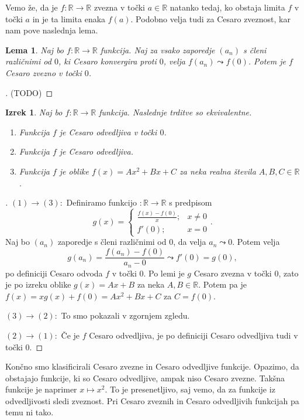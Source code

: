 \documentclass[a4paper,12pt]{article}
\theoremstyle{definition}
\theoremstyle{plain}
\newtheorem{izrek}{Izrek}
\newtheorem{lema}{Lema}
\newenvironment{dokaz}{\begin{proof}[\bfseries\upshape\proofname]}{\end{proof}}
\begin{document}
Vemo že, da je $f: \mathbb{R} \rightarrow \mathbb{R}$ zvezna v točki $a \in \mathbb{R}$ natanko tedaj, ko obstaja limita $f$ v točki $a$ in je ta limita enaka $f(a)$. Podobno velja tudi za Cesaro zveznost, kar nam pove naslednja lema.
\begin{lema}
    Naj bo $f: \mathbb{R} \rightarrow \mathbb{R}$ funkcija. Naj za vsako zaporedje $(a_n)$ s členi različnimi od $0$, ki Cesaro konvergira proti $0$, velja $f(a_n) \leadsto f(0)$. Potem je $f$ Cesaro zvezno v točki $0$.
\end{lema}
\begin{dokaz}
    (TODO)
\end{dokaz}

\begin{izrek}
    Naj bo $f: \mathbb{R} \rightarrow \mathbb{R}$ funkcija. Naslednje trditve so ekvivalentne.
    \begin{enumerate}
        \item Funkcija $f$ je Cesaro odvedljiva v točki $0$.
        \item Funkcija $f$ je Cesaro odvedljiva.
        \item Funkcija $f$ je oblike $f(x) = Ax^2 + Bx + C$ za neka realna števila $A, B, C \in \mathbb{R}$.
    \end{enumerate}
\end{izrek}
\begin{dokaz}
    $(1) \rightarrow (3): $ Definiramo funkcijo $: \mathbb{R} \rightarrow \mathbb{R}$ s predpisom 
    $$
    g(x) = \begin{cases}
        \frac{f(x)-f(0)}{x}; & x \neq 0\\
        f'(0); & x = 0
    \end{cases}.
    $$
    Naj bo $(a_n)$ zaporedje s členi različnimi od $0$, da velja $a_n \leadsto 0$. Potem velja 
    $$g(a_n) = \frac{f(a_n)-f(0)}{a_n-0} \leadsto f'(0) = g(0),$$
    po definiciji Cesaro odvoda $f$ v točki $0$. Po lemi je $g$ Cesaro zvezna v točki $0$, zato je po izreku oblike $g(x) = Ax + B$ za neka $A, B \in \mathbb{R}$. Potem pa je 
    $f(x) = xg(x) + f(0) = Ax^2 + Bx + C$ za $C = f(0)$.

    $(3) \rightarrow (2): $ To smo pokazali v zgornjem zgledu.

    $(2) \rightarrow (1): $ Če je $f$ Cesaro odvedljiva, je po definiciji Cesaro odvedljiva tudi v točki $0$.
\end{dokaz}
Končno smo klasificirali Cesaro zvezne in Cesaro odvedljive funkcije. Opazimo, da obstajajo funkcije, ki so Cesaro odvedljive, ampak niso Cesaro zvezne. Takšna funkcije je naprimer $x \mapsto x^2$. To je presenetljivo, saj vemo, da za funkcije iz odvedljivosti sledi zveznost. Pri Cesaro zveznih in Cesaro odvedljivih funkcijah pa temu ni tako.
\end{document}
